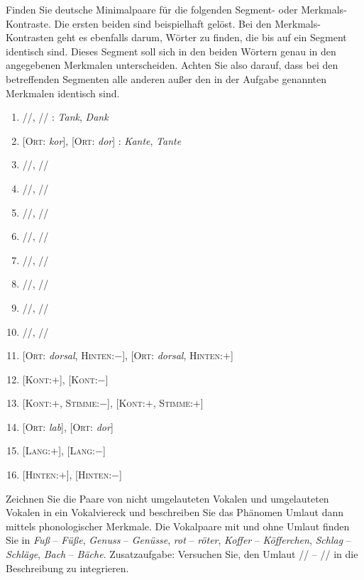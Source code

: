 \Uebungen

\Uebung \label{u41} Finden Sie deutsche Minimalpaare für die folgenden Segment- oder Merkmals-Kontraste.
Die ersten beiden sind beispielhaft gelöst.
Bei den Merkmals-Kontrasten geht es ebenfalls darum, Wörter zu finden, die bis auf ein Segment identisch sind.
Dieses Segment soll sich in den beiden Wörtern genau in den angegebenen Merkmalen unterscheiden.
Achten Sie also darauf, dass bei den betreffenden Segmenten alle anderen außer den in der Aufgabe genannten Merkmalen identisch sind.

\begin{enumerate}\Lf
  \item{//, // : \textit{Tank}, \textit{Dank}}
  \item{[\textsc{Ort}: \textit{kor}], [\textsc{Ort}: \textit{dor}] : \textit{Kante}, \textit{Tante}}
  \item{//, //}
  \item{//, //}
  \item{//, //}
  \item{//, //}
  \item{//, //}
  \item{//, //}
  \item{//, //}
  \item{//, //}
  \item{[\textsc{Ort}: \textit{dorsal}, \textsc{Hinten}:$-$], [\textsc{Ort}: \textit{dorsal}, \textsc{Hinten}:$+$]}
  \item{[\textsc{Kont}:$+$], [\textsc{Kont}:$-$]}
  \item{[\textsc{Kont}:$+$, \textsc{Stimme}:$-$], [\textsc{Kont}:$+$, \textsc{Stimme}:$+$]}
  \item{[\textsc{Ort}: \textit{lab}], [\textsc{Ort}: \textit{dor}]}
  \item{[\textsc{Lang}:$+$], [\textsc{Lang}:$-$]}
  \item{[\textsc{Hinten}:$+$], [\textsc{Hinten}:$-$]}
\end{enumerate}

\Uebung \label{u42} Zeichnen Sie die Paare von nicht umgelauteten Vokalen und umgelauteten Vokalen in ein Vokalviereck und beschreiben Sie das Phänomen Umlaut dann mittels phonologischer Merkmale.
Die Vokalpaare mit und ohne Umlaut finden Sie in \textit{Fuß} -- \textit{Füße}, \textit{Genuss} -- \textit{Genüsse}, \textit{rot} -- \textit{röter}, \textit{Koffer} -- \textit{Köfferchen}, \textit{Schlag} -- \textit{Schläge}, \textit{Bach} -- \textit{Bäche}.
Zusatzaufgabe: Versuchen Sie, den Umlaut // -- // in die Beschreibung zu integrieren.

